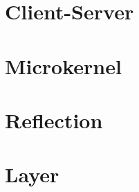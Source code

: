 
\section{Client-Server}


\section{Microkernel}


\section{Reflection}


\pagebreak
\section{Layer}
